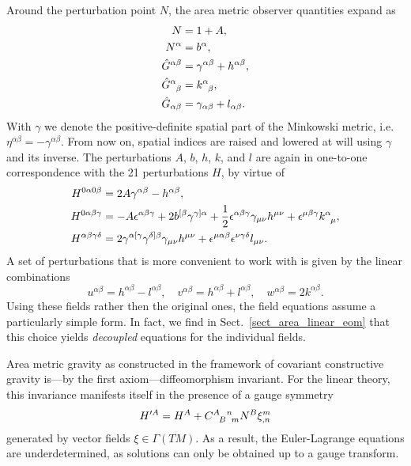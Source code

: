 Around the perturbation point $N$, the area metric observer quantities expand as
\begin{equation}
  \begin{aligned}
    N &{} = 1 + A, \\
    N^\alpha &{} = b^\alpha, \\
    \hat G^{\alpha\beta} &{} = \gamma^{\alpha\beta} + h^{\alpha\beta}, \\
    \hat G^\alpha_{\hphantom\alpha\beta} &{} = k^\alpha_{\hphantom\alpha\beta}, \\
    \hat G_{\alpha\beta} &{} = \gamma_{\alpha\beta} + l_{\alpha\beta}.
  \end{aligned}
\end{equation}
With $\gamma$ we denote the positive-definite spatial part of the Minkowski metric, i.e.~$\eta^{\alpha\beta} = - \gamma^{\alpha\beta}$. From now on, spatial indices are raised and lowered at will using $\gamma$ and its inverse. The perturbations $A$, $b$, $h$, $k$, and $l$ are again in one-to-one correspondence with the 21 perturbations $H$, by virtue of
\begin{equation}\label{area_metric_perturbation}
  \begin{aligned}
    H^{0\alpha0\beta} &{} = 2 A \gamma^{\alpha\beta} - h^{\alpha\beta}, \\
    H^{0\alpha\beta\gamma} &{} = -A \epsilon^{\alpha\beta\gamma} + 2 b^{\lbrack\beta} \gamma^{\gamma\rbrack\alpha} + \frac{1}{2} \epsilon^{\alpha\beta\gamma} \gamma_{\mu\nu} h^{\mu\nu} + \epsilon^{\mu\beta\gamma} k^\alpha_{\hphantom\alpha\mu}, \\
    H^{\alpha\beta\gamma\delta} &{} = 2\gamma^{\alpha\lbrack\gamma}\gamma^{\delta\rbrack\beta} \gamma_{\mu\nu} h^{\mu\nu} + \epsilon^{\mu\alpha\beta} \epsilon^{\nu\gamma\delta} l_{\mu\nu}.
  \end{aligned}
\end{equation}
A set of perturbations that is more convenient to work with is given by the linear combinations
\begin{equation}
  u^{\alpha\beta} = h^{\alpha\beta} - l^{\alpha\beta},\quad v^{\alpha\beta} = h^{\alpha\beta} + l^{\alpha\beta},\quad w^{\alpha\beta} = 2 k^{\alpha\beta}.
\end{equation}
Using these fields rather then the original ones, the field equations assume a particularly simple form. In fact, we find in Sect.~\ref{sect_area_linear_eom} that this choice yields \emph{decoupled} equations for the individual fields.

Area metric gravity as constructed in the framework of covariant constructive gravity is---by the first axiom---diffeomorphism invariant. For the linear theory, this invariance manifests itself in the presence of a gauge symmetry
\begin{equation}\label{area_gauge_transform}
  H^{\prime A} = H^A + \gmc{A}{B}{n}{m} N^B \xi^m_{,n}
\end{equation}
generated by vector fields $\xi \in \Gamma(TM)$. As a result, the Euler-Lagrange equations are underdetermined, as solutions can only be obtained up to a gauge transform.

